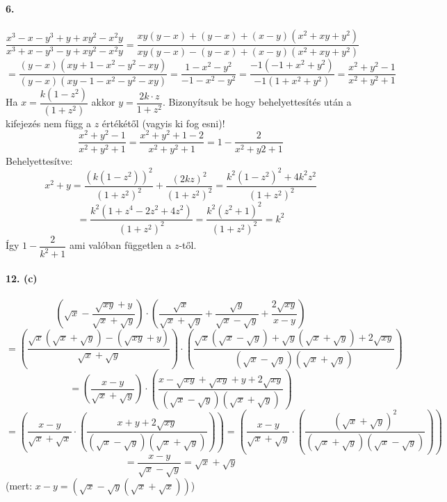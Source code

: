 \documentclass[12pt,a4paper,fleqn]{article}
\begin{document}
\textbf{6.} \\\\
$$ \dfrac{x^3-x-y^3+y+xy^2-x^2y}{x^3+x-y^3-y+xy^2-x^2y} =
  \dfrac{xy(y-x)+(y-x)+(x-y)(x^2+xy+y^2)}{xy(y-x)-(y-x)+(x-y)(x^2+xy+y^2)} $$
  $$= \dfrac{(y-x)(xy+1-x^2-y^2-xy)}{(y-x)(xy-1-x^2-y^2-xy)}
  = \dfrac{1-x^2-y^2}{-1-x^2-y^2} = \dfrac{-1(-1+x^2+y^2)}{-1(1+x^2+y^2)} = \dfrac{x^2+y^2-1}{x^2+y^2+1}$$
Ha $x = \dfrac{k(1-z^2)}{(1+z^2)}$ akkor $y = \dfrac{2k \cdot z}{1+z^2}$.
Bizonyítsuk be hogy behelyettesítés után a kifejezés nem függ a $z$ értékétől (vagyis ki fog esni)!
$$ \dfrac{x^2+y^2-1}{x^2+y^2+1} = \dfrac{x^2+y^2+1-2}{x^2+y^2+1} = 1 - \dfrac{2}{x^2+y2+1} $$
Behelyettesítve:
$$ x^2+y=\dfrac{(k(1-z^2))^2}{(1+z^2)^2} + \dfrac{(2kz)^2}{(1+z^2)^2} = \dfrac{k^2(1-z^2)^2+4k^2z^2}{(1+z^2)^2}$$
$$ = \dfrac{k^2(1+z^4-2z^2+4z^2)}{(1+z^2)^2} = \dfrac{k^2(z^2+1)^2}{(1+z^2)^2} = k^2$$
Így $1-\dfrac{2}{k^2+1}$ ami valóban független a $z$-től. \\\\
\textbf{12. (c)} \\\\
$$ \left(\sqrt{x} - \dfrac{\sqrt{xy}+y}{\sqrt{x}+\sqrt{y}}\right) \cdot \left( \dfrac{\sqrt{x}}{\sqrt{x}+\sqrt{y}} + \dfrac{\sqrt{y}}{\sqrt{x}-\sqrt{y}} + \dfrac{2\sqrt{xy}}{x-y} \right) $$
$$ = \left(\dfrac{\sqrt{x}(\sqrt{x}+\sqrt{y})-(\sqrt{xy}+y)}{\sqrt{x} + \sqrt{y}} \right) \cdot \left( \dfrac{\sqrt{x}(\sqrt{x}-\sqrt{y})+\sqrt{y}(\sqrt{x}+\sqrt{y})+2\sqrt{xy}}{(\sqrt{x}-\sqrt{y})(\sqrt{x}+\sqrt{y})} \right)$$
$$ = \left( \dfrac{x-y}{\sqrt{x}+\sqrt{y}} \right) \cdot \left( \dfrac{x-\sqrt{xy}+\sqrt{xy}+y+2\sqrt{xy}}{(\sqrt{x}-\sqrt{y})(\sqrt{x}+\sqrt{y})} \right)$$
$$ = \left( \dfrac{x-y}{\sqrt{x}+\sqrt{x}} \cdot \left( \dfrac{x+y+2\sqrt{xy}}{(\sqrt{x}-\sqrt{y})(\sqrt{x}+\sqrt{y})} \right) \right) = \left( \dfrac{x-y}{\sqrt{x}+\sqrt{y}} \cdot \left( \dfrac{(\sqrt{x}+\sqrt{y})^2}{(\sqrt{x}+\sqrt{y})(\sqrt{x}-\sqrt{y})} \right) \right)$$
$$ = \dfrac{x-y}{\sqrt{x} - \sqrt{y}} = \sqrt{x} + \sqrt{y}$$ (mert: $x-y=(\sqrt{x}-\sqrt{y}(\sqrt{x}+\sqrt{x}))$)
\end{document}
